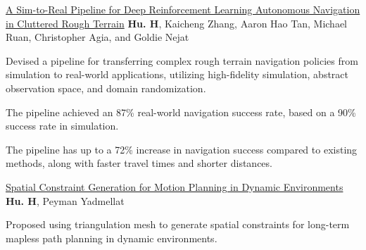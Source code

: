 


\begin{cventries}
  \cvpublicationentrysimple
    {\href{https://ieeexplore.ieee.org/document/9468918}{A Sim-to-Real Pipeline for Deep Reinforcement Learning Autonomous Navigation in Cluttered Rough Terrain}} %
    {\textbf{Hu. H}, Kaicheng Zhang, Aaron Hao Tan, Michael Ruan, Christopher Agia, and Goldie Nejat \hspace*{0pt}\hfill {}} %
    {
    \begin{cvitems}
      \item{Devised a pipeline for transferring complex rough terrain navigation policies from simulation to real-world applications, utilizing high-fidelity simulation, abstract observation space, and domain randomization.
      }
      \item{
        The pipeline achieved an 87\% real-world navigation success rate, based on a 90\% success rate in simulation.
			}
      \item{
				The pipeline has up to a 72\% increase in navigation success compared to existing methods, along with faster travel times and shorter distances.
      }
    \end{cvitems}
    }
  \cvpublicationentrysimple
    {\href{https://arxiv.org/abs/2110.14786}{Spatial Constraint Generation for Motion Planning in Dynamic Environments}} %
    {\textbf{Hu. H}, Peyman Yadmellat \hspace*{0pt}\hfill {}} %
    {
    \begin{cvitems}
      \item {Proposed using triangulation mesh to generate spatial constraints for long-term mapless path planning in dynamic environments.}

\end{cvitems}}
\end{cventries}
